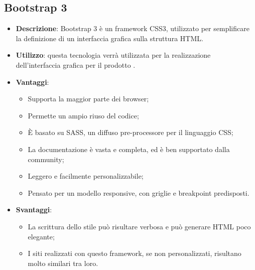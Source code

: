 \subsection{Bootstrap 3}
\begin{itemize}
	\item \textbf{Descrizione}: Bootstrap 3 è un framework CSS3, utilizzato per semplificare la definizione di un interfaccia grafica sulla struttura HTML.
	\item \textbf{Utilizzo}: questa tecnologia verrà utilizzata per la realizzazione dell'interfaccia grafica per il prodotto \progetto.
	\item \textbf{Vantaggi}:
	\begin{itemize}
		\item Supporta la maggior parte dei browser;
		\item Permette un ampio riuso del codice;
		\item \MakeUppercase{è} basato su SASS, un diffuso pre-processore per il linguaggio CSS;
		\item La documentazione è vasta e completa, ed è ben supportato dalla community;
		\item Leggero e facilmente personalizzabile;
		\item Pensato per un modello responsive, con griglie e breakpoint predisposti.
	\end{itemize}
	\item \textbf{Svantaggi}:
	\begin{itemize}
		\item La scrittura dello stile può risultare verbosa e può generare HTML poco elegante;
		\item I siti realizzati con questo framework, se non personalizzati, risultano molto similari tra loro.
	\end{itemize}
\end{itemize}

